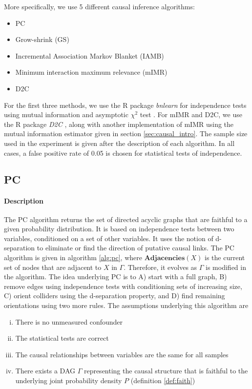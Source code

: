 More specifically, we use 5 different causal inference algorithms:
\noprelistbreak
\begin{itemize}
    \item PC
	\item Grow-shrink (GS)
	\item Incremental Association Markov Blanket (IAMB)
	\item Minimum interaction maximum relevance (mIMR)
	\item D2C
\end{itemize}

For the first three methods, we use the R package \emph{bnlearn}
\parencite{scutari2009learning} for independence tests using mutual information
and asymptotic $\chi^2$ test \parencite{good2013permutation}. For mIMR and D2C,
we use the R package \emph{D2C} \parencite{bontempi2015dependency}, along with
another implementation of mIMR using the mutual information estimator given in
section \ref{sec:causal_intro}. The sample size used in the experiment is given
after the description of each algorithm. In all cases, a false positive rate of
0.05 is chosen for statistical tests of independence.

\subsection{PC}

\paragraph{Description} The PC algorithm \parencite{spirtes1991algorithm} returns
the set of directed acyclic graphs that are faithful to a given probability
distribution. It is based on independence tests between two variables,
conditioned on a set of other variables. It uses the notion of d-separation to
eliminate or find the direction of putative causal links. The PC algorithm is
given in algorithm \ref{alg:pc}, where $\textbf{Adjacencies}(X)$ is the current
set of nodes that are adjacent to $X$ in $\Gamma$. Therefore, it evolves as
$\Gamma$ is modified in the algorithm. The idea underlying PC is to A) start
with a full graph, B) remove edges using independence tests with conditioning
sets of increasing size, C) orient colliders using the d-separation property,
and D) find remaining orientations using two more rules. The assumptions
underlying this algorithm are

\begin{enumerate}[(i)]
    \item There is no unmeasured confounder
    \item The statistical tests are correct
    \item The causal relationships between variables are the same for all samples
    \item There exists a DAG $\Gamma$ representing the causal structure that is
    faithful to the underlying joint probability density $P$ (definition
    \ref{def:faith})
\end{enumerate}

